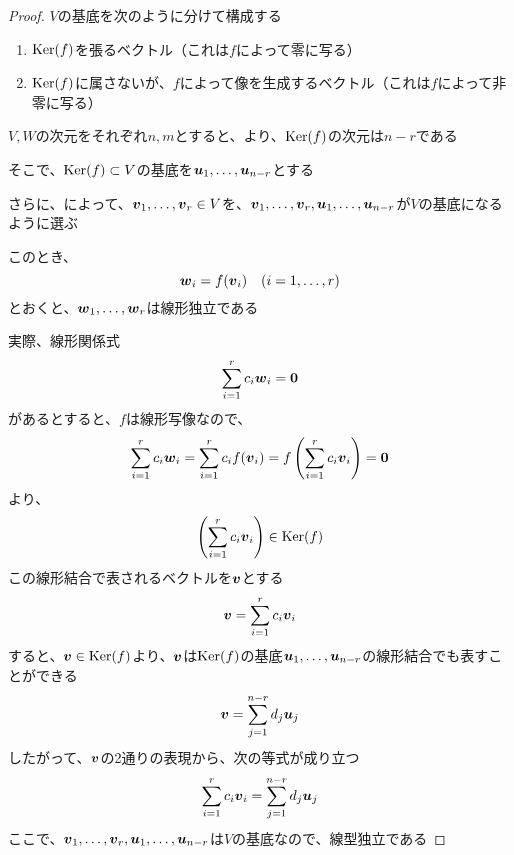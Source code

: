\documentclass[../../../topic_linear-algebra]{subfiles}
\begin{document}
\begin{proof}
  $V$の基底を次のように分けて構成する
  \begin{enumerate}[label=\romanlabel]
    \item $\operatorname{Ker}(f)$を張るベクトル（これは$f$によって零に写る）
    \item $\operatorname{Ker}(f)$に属さないが、$f$によって像を生成するベクトル（これは$f$によって非零に写る）
  \end{enumerate}

  $V,W$の次元をそれぞれ$n,m$とすると、より、$\operatorname{Ker}(f)$の次元は$n - r$である

  そこで、$\operatorname{Ker}(f) \subset V$の基底を$\vb*{u}_1,\ldots,\vb*{u}_{n-r}$とする

  さらに、によって、$\vb*{v}_1,\ldots,\vb*{v}_r \in V$を、$\vb*{v}_1,\ldots,\vb*{v}_r,\vb*{u}_1,\ldots,\vb*{u}_{n-r}$が$V$の基底になるように選ぶ

  \br

  このとき、
  \begin{equation*}
    \vb*{w}_i =  f(\vb*{v}_i) \quad (i = 1, \ldots, r)
  \end{equation*}
  とおくと、$\vb*{w}_1,\ldots,\vb*{w}_r$は線形独立である

  実際、線形関係式
  \begin{equation*}
    \sum_{i=1}^r c_i \vb*{w}_i = \vb*{0}
  \end{equation*}
  があるとすると、$f$は線形写像なので、
  \begin{equation*}
    \sum_{i=1}^r c_i \vb*{w}_i = \sum_{i=1}^r c_i f(\vb*{v}_i) = f\left(\sum_{i=1}^r c_i \vb*{v}_i\right) = \vb*{0}
  \end{equation*}
  より、
  \begin{equation*}
    \left(\sum_{i=1}^r c_i \vb*{v}_i\right) \in \operatorname{Ker}(f)
  \end{equation*}
  この線形結合で表されるベクトルを$\vb*{v}$とする
  \begin{equation*}
    \vb*{v} = \sum_{i=1}^r c_i \vb*{v}_i
  \end{equation*}
  すると、$\vb*{v} \in \operatorname{Ker}(f)$より、$\vb*{v}$は$\operatorname{Ker}(f)$の基底$\vb*{u}_1,\ldots,\vb*{u}_{n-r}$の線形結合でも表すことができる
  \begin{equation*}
    \vb*{v} = \sum_{j=1}^{n-r} d_j \vb*{u}_j
  \end{equation*}
  したがって、$\vb*{v}$の2通りの表現から、次の等式が成り立つ
  \begin{equation*}
    \sum_{i=1}^r c_i \vb*{v}_i = \sum_{j=1}^{n-r} d_j \vb*{u}_j
  \end{equation*}
  ここで、$\vb*{v}_1,\ldots,\vb*{v}_r,\vb*{u}_1,\ldots,\vb*{u}_{n-r}$は$V$の基底なので、線型独立である


\end{proof}
\end{document}
